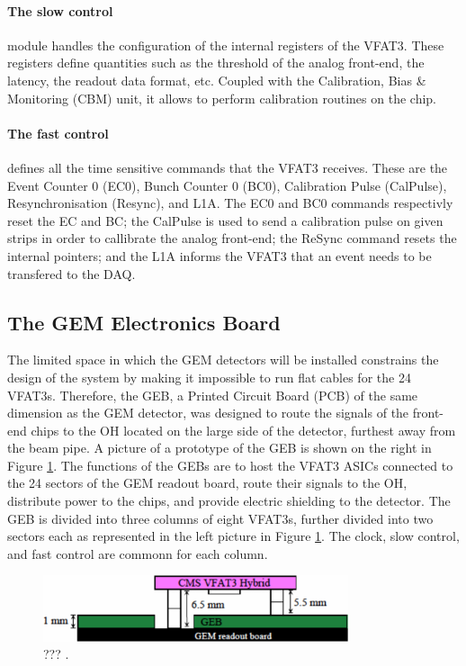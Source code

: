       \paragraph{The slow control} module handles the configuration of the internal registers of the VFAT3. These registers define quantities such as the threshold of the analog front-end, the latency, the readout data format, etc. Coupled with the Calibration, Bias \& Monitoring (CBM) unit, it allows to perform calibration routines on the chip. \\

      \paragraph{The fast control} defines all the time sensitive commands that the VFAT3 receives. These are the Event Counter 0 (EC0), Bunch Counter 0 (BC0), Calibration Pulse (CalPulse), Resynchronisation (Resync), and L1A. The EC0 and BC0 commands respectivly reset the EC and BC; the CalPulse is used to send a calibration pulse on given strips in order to callibrate the analog front-end; the ReSync command resets the internal pointers; and the L1A informs the VFAT3 that an event needs to be transfered to the DAQ.

    \subsection{The GEM Electronics Board}

      The limited space in which the GEM detectors will be installed constrains the design of the system by making it impossible to run flat cables for the 24 VFAT3s. Therefore, the GEB, a Printed Circuit Board (PCB) of the same dimension as the GEM detector, was designed to route the signals of the front-end chips to the OH located on the large side of the detector, furthest away from the beam pipe. A picture of a prototype of the GEB is shown on the right in Figure \ref{fig:II-2-daq-geb}. The functions of the GEBs are to host the VFAT3 ASICs connected to the 24 sectors of the GEM readout board, route their signals to the OH, distribute power to the chips, and provide electric shielding to the detector. The GEB is divided into three columns of eight VFAT3s, further divided into two sectors each as represented in the left picture in Figure \ref{fig:II-2-daq-geb}. The clock, slow control, and fast control are commonn for each column. \\

      \begin{figure}[h!]
        \centering
        \includegraphics[width=0.8\textwidth]{img/II-2-daq/geb.pdf}
        \caption{??? \cite{Colaleo:2021453}.}
        \label{fig:II-2-daq-geb}
      \end{figure}

